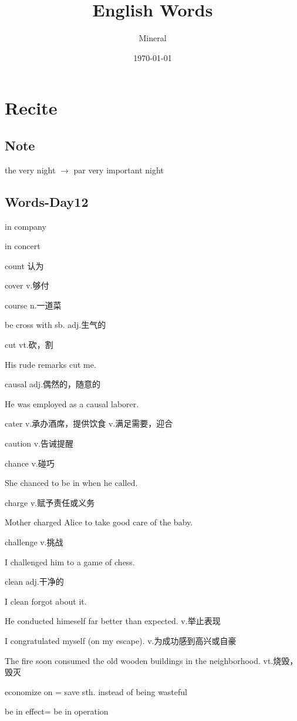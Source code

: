 \documentclass[utf8]{ctexart}
\author{Mineral}
\title{English Words}
\date {\today}
\begin{document}
	\maketitle
	\section{Recite}
	\subsection{Note}
	\par the very night $\to $
	par \the very important night	 
	
	\subsection{Words-Day12}
	\par in company 
	\par in concert 	
	\par count 认为
	\par cover v.够付
	\par course n.一道菜
	\par be cross with sb. adj.生气的
	\par cut vt.砍，割
	\par His rude remarks cut me.
	\par causal adj.偶然的，随意的
	\par He was employed as a causal laborer.											
	\par cater v.承办酒席，提供饮食  v.满足需要，迎合
	\par caution v.告诫提醒
	\par chance v.碰巧
	\par She chanced to be in when he called.
	\par charge v.赋予责任或义务
	\par Mother charged Alice to take good care of the baby.
	\par challenge v.挑战
	\par I challenged him to a game of chess.
	\par clean adj.干净的
	\par I clean forgot about it.
	\par He conducted himeself far better than expected. v.举止表现
	\par I congratulated myself (on my escape). v.为成功感到高兴或自豪
	\par The fire soon consumed the old wooden buildings in the neighborhood. vt.烧毁，毁灭
	\par economize on = save sth. instead of being wasteful
	\par be in effect= be in operation					
\end{document}
